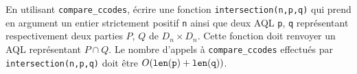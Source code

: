 \begin{enumerate}[resume]
En utilisant {\tt compare\_ccodes}, \'ecrire une fonction {\tt intersection(n,p,q)} qui prend en argument un entier strictement positif {\tt n} ainsi que deux AQL {\tt p}, {\tt q} repr\'esentant respectivement deux parties $P$, $Q$ de $D_n\times D_n$. Cette fonction doit renvoyer un AQL repr\'esentant $P\cap Q$.\newline
Le nombre d'appels \`a {\tt compare\_ccodes} effectu\'es par {\tt intersection(n,p,q)} doit \^etre $O({\tt len(p)+len(q)})$.
\end{enumerate}

